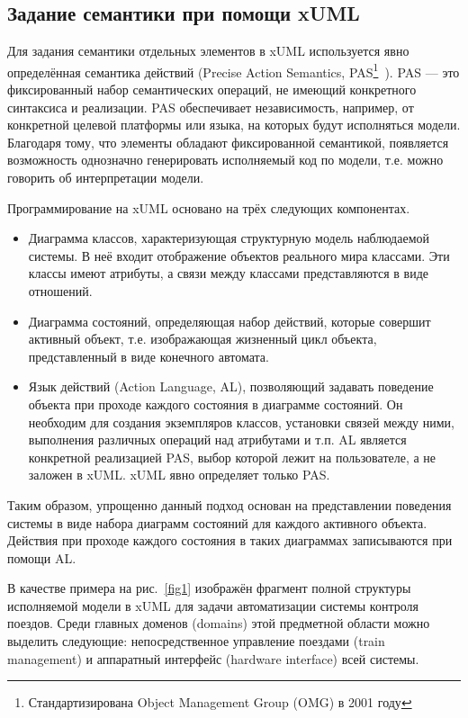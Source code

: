 \documentclass[a5paper]{article}
\begin{document}
\subsection{Задание семантики при помощи xUML}

Для задания семантики отдельных элементов в xUML используется явно определённая семантика действий (Precise Action Semantics, PAS\footnote{Стандартизирована Object Management Group (OMG) в 2001 году}~\cite{xuml3}). PAS — это фиксированный набор семантических операций, не имеющий конкретного синтаксиса и реализации. PAS обеспечивает независимость, например, от конкретной целевой платформы или языка, на которых будут исполняться модели. Благодаря тому, что элементы обладают фиксированной семантикой, появляется возможность однозначно генерировать исполняемый код по модели, т.е. можно говорить об интерпретации модели.

Программирование на  xUML основано на трёх следующих компонентах.
\begin{itemize}
 \item Диаграмма классов, характеризующая структурную модель наблюдаемой системы. В неё входит отображение объектов реального мира классами. Эти классы имеют атрибуты, а связи между классами представляются в виде отношений.
 \item Диаграмма состояний, определяющая набор действий, которые совершит активный объект, т.е. изображающая жизненный цикл объекта, представленный в виде конечного автомата.
 \item Язык действий (Action Language, AL), позволяющий задавать поведение объекта при проходе каждого состояния в диаграмме состояний. Он необходим для создания экземпляров классов, установки связей между ними, выполнения различных операций над атрибутами и т.п. AL является конкретной реализацией PAS, выбор которой лежит на пользователе, а не заложен в xUML. xUML явно определяет только PAS.
\end{itemize}

Таким образом, упрощенно данный подход основан на представлении поведения системы в виде набора диаграмм состояний для каждого активного объекта. Действия при проходе каждого состояния в таких диаграммах записываются при помощи AL.

В качестве примера на рис.~\ref{fig1} изображён фрагмент полной структуры исполняемой модели в xUML для задачи автоматизации системы контроля поездов. Среди главных доменов (domains) этой предметной области можно выделить следующие: непосредственное управление поездами (train management) и аппаратный интерфейс (hardware interface) всей системы.
\end{document}
